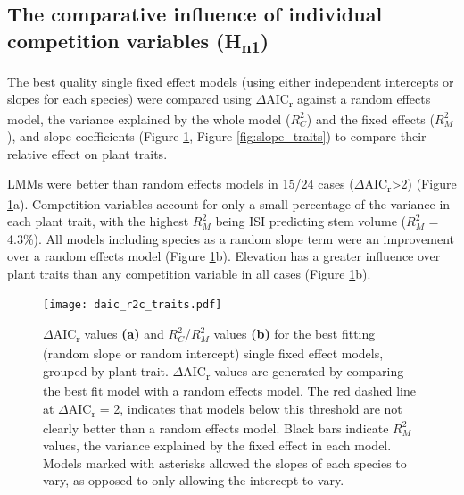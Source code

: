 \documentclass[a4paper,10pt,]{report}
\begin{document}
\subsection*{The comparative influence of individual competition variables (H\textsubscript{n1})}
The best quality single fixed effect models (using either independent intercepts or slopes for each species) were compared using $\Delta$AIC\textsubscript{r} against a random effects model,  the variance explained by the whole model ($R_C^2$) and the fixed effects ($R_M^2$), and slope coefficients (Figure \ref{fig:daic_r2c_traits}, Figure \ref{fig:slope_traits}) to compare their relative effect on plant traits. 

LMMs were better than random effects models in 15/24 cases ($\Delta$AIC\textsubscript{r}>2) (Figure \ref{fig:daic_r2c_traits}a).  Competition variables account for only a small percentage of the variance in each plant trait, with the highest $R_M^2$ being ISI predicting stem volume ($R_M^2$ = 4.3\%). All models including species as a random slope term were an improvement over a random effects model (Figure \ref{fig:daic_r2c_traits}b).  Elevation has a greater influence over plant traits than any competition variable in all cases (Figure \ref{fig:daic_r2c_traits}b).

\begin{figure}[H]
\centering
\texttt{[image: daic\_r2c\_traits.pdf]}
\caption{$\Delta$AIC\textsubscript{r} values \textbf{(a)} and $R_C^2$/$R_M^2$ values \textbf{(b)} for the best fitting (random slope or random intercept) single fixed effect models, grouped by plant trait. $\Delta$AIC\textsubscript{r} values are generated by comparing the best fit model with a random effects model. The red dashed line at $\Delta$AIC\textsubscript{r} = 2, indicates that models below this threshold are not clearly better than a random effects model. Black bars indicate $R_M^2$ values, the variance explained by the fixed effect in each model. Models marked with asterisks allowed the slopes of each species to vary, as opposed to only allowing the intercept to vary.}
\label{fig:daic_r2c_traits}
\end{figure}
\end{document}
